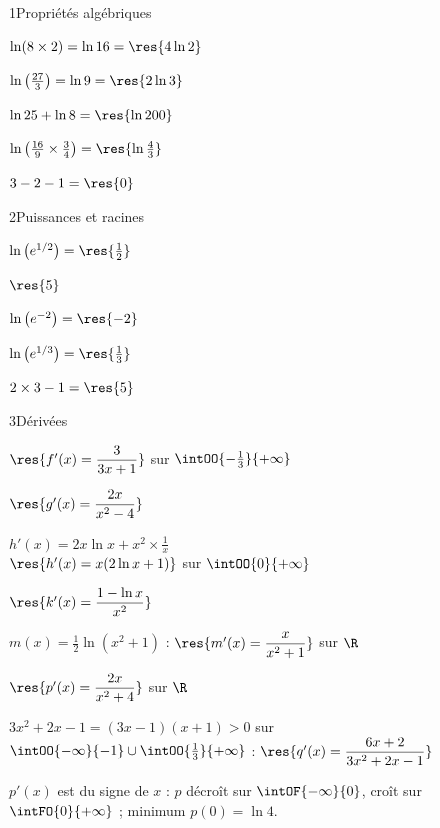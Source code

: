 

\begin{deuxcolonnes}

\begin{corrige}{1}{Propriétés algébriques}
\begin{questions}
  \item $\ln(8\times2)=\ln16=\res{4\ln2}$
  \item $\ln\left(\frac{27}{3}\right)=\ln9=\res{2\ln3}$
  \item $\ln25+\ln8=\res{\ln200}$
  \item $\ln\left(\frac{16}{9}\times\frac34\right)=\res{\ln\frac43}$
  \item $3-2-1=\res{0}$
\end{questions}
\end{corrige}

\begin{corrige}{2}{Puissances et racines}
\begin{questions}
  \item $\ln\left(e^{1/2}\right)=\res{\frac12}$
  \item $\res{5}$
  \item $\ln\left(e^{-2}\right)=\res{-2}$
  \item $\ln\left(e^{1/3}\right)=\res{\frac13}$
  \item $2\times3-1=\res{5}$
\end{questions}
\end{corrige}

\begin{corrige}{3}{Dérivées}
\begin{questions}
  \item $\res{f'(x)=\dfrac{3}{3x+1}}$ sur $\intOO{-\frac13}{+\infty}$
  \item $\res{g'(x)=\dfrac{2x}{x^{2}-4}}$
  \item $h'(x)=2x\ln x+x^{2}\times\frac1x$\\ $\res{h'(x)=x(2\ln x+1)}$ sur $\intOO{0}{+\infty}$
  \item $\res{k'(x)=\dfrac{1-\ln x}{x^{2}}}$
  \item $m(x)=\frac12\ln\left(x^{2}+1\right)$ : $\res{m'(x)=\dfrac{x}{x^{2}+1}}$ sur $\R$
  \item $\res{p'(x)=\dfrac{2x}{x^{2}+4}}$ sur $\R$
  \item $3x^{2}+2x-1=(3x-1)(x+1)>0$ sur $\intOO{-\infty}{-1}\cup\intOO{\frac13}{+\infty}$ : $\res{q'(x)=\dfrac{6x+2}{3x^{2}+2x-1}}$
\end{questions}
$p'(x)$ est du signe de $x$ : $p$ décroît sur $\intOF{-\infty}{0}$, croît sur $\intFO{0}{+\infty}$ ; minimum $p(0)=\ln4$.
\end{corrige}


\end{deuxcolonnes}
